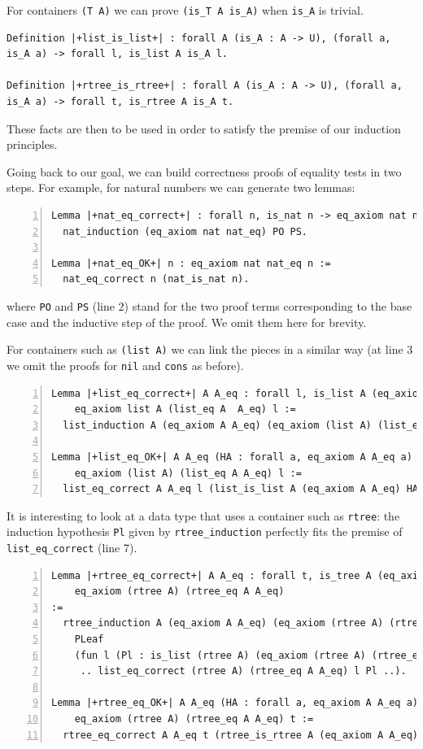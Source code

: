 \documentclass[a4paper,UKenglish,cleveref, autoref]{lipics-v2019}
\begin{document}
\noindent
For containers \lstinline+(T A)+ we can prove \lstinline+(is_T A is_A)+
when \lstinline+is_A+ is trivial.
\begin{lstlisting}
Definition |+list_is_list+| : forall A (is_A : A -> U), (forall a, is_A a) -> forall l, is_list A is_A l.

Definition |+rtree_is_rtree+| : forall A (is_A : A -> U), (forall a, is_A a) -> forall t, is_rtree A is_A t.
\end{lstlisting}

\noindent
These facts are then to be used in order to satisfy the
premise of our induction principles. 

Going back to our goal, we can build correctness
proofs of equality tests in two steps.
For example, for natural numbers we can generate two
lemmas:
\begin{lstlisting}[numbers=left]
Lemma |+nat_eq_correct+| : forall n, is_nat n -> eq_axiom nat nat_eq n :=
  nat_induction (eq_axiom nat nat_eq) PO PS.

Lemma |+nat_eq_OK+| n : eq_axiom nat nat_eq n :=
  nat_eq_correct n (nat_is_nat n).
\end{lstlisting}

\noindent
where \lstinline+PO+ and \lstinline+PS+ (line 2) stand for
the two proof terms corresponding to the base case and the inductive
step of the proof. We omit them here for brevity.

For containers such as \lstinline+(list A)+ we can link the pieces in a
similar way (at line 3 we omit the proofs for
\lstinline+nil+ and \lstinline+cons+ as before).
\begin{lstlisting}[numbers=left]
Lemma |+list_eq_correct+| A A_eq : forall l, is_list A (eq_axiom A  A_eq) l ->
    eq_axiom list A (list_eq A  A_eq) l :=
  list_induction A (eq_axiom A A_eq) (eq_axiom (list A) (list_eq A A_eq)) Pnil Pcons.

Lemma |+list_eq_OK+| A A_eq (HA : forall a, eq_axiom A A_eq a) l :
    eq_axiom (list A) (list_eq A A_eq) l :=
  list_eq_correct A A_eq l (list_is_list A (eq_axiom A A_eq) HA l).
\end{lstlisting}

\noindent
It is interesting to look at a data type that uses a container such as
\lstinline+rtree+: the induction hypothesis
\lstinline+Pl+
given by \lstinline+rtree_induction+ perfectly fits
the premise of \lstinline+list_eq_correct+ (line 7).
\begin{lstlisting}[numbers=left]
Lemma |+rtree_eq_correct+| A A_eq : forall t, is_tree A (eq_axiom A A_eq) t ->
    eq_axiom (rtree A) (rtree_eq A A_eq)
:=
  rtree_induction A (eq_axiom A A_eq) (eq_axiom (rtree A) (rtree_eq Afa))
    PLeaf
    (fun l (Pl : is_list (rtree A) (eq_axiom (rtree A) (rtree_eq A A_eq)) l) =>
     .. list_eq_correct (rtree A) (rtree_eq A A_eq) l Pl ..).

Lemma |+rtree_eq_OK+| A A_eq (HA : forall a, eq_axiom A A_eq a) t :
    eq_axiom (rtree A) (rtree_eq A A_eq) t :=
  rtree_eq_correct A A_eq t (rtree_is_rtree A (eq_axiom A A_eq) HA t).
\end{lstlisting}
\end{document}

